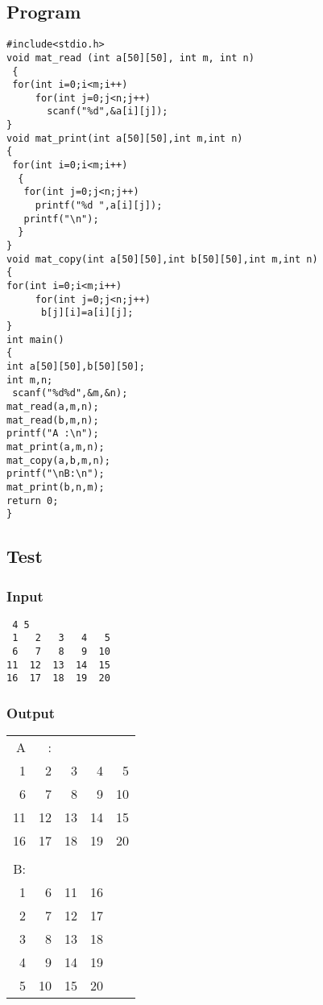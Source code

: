 \documentclass[11pt]{article}
\begin{document}
\subsection*{Program}
\label{sec-7-3}
\begin{verbatim}
#include<stdio.h>
void mat_read (int a[50][50], int m, int n)
 {
 for(int i=0;i<m;i++)
     for(int j=0;j<n;j++)
       scanf("%d",&a[i][j]);
}
void mat_print(int a[50][50],int m,int n)
{
 for(int i=0;i<m;i++)
  {
   for(int j=0;j<n;j++)
     printf("%d ",a[i][j]);
   printf("\n");
  }
}
void mat_copy(int a[50][50],int b[50][50],int m,int n)
{
for(int i=0;i<m;i++)
     for(int j=0;j<n;j++)
      b[j][i]=a[i][j];
}
int main()
{
int a[50][50],b[50][50];
int m,n;
 scanf("%d%d",&m,&n);
mat_read(a,m,n);
mat_read(b,m,n);
printf("A :\n");
mat_print(a,m,n);
mat_copy(a,b,m,n);
printf("\nB:\n");
mat_print(b,n,m);
return 0;
}
\end{verbatim}
\subsection*{Test}
\label{sec-7-4}
\subsubsection*{Input}
\label{sec-7-4-1}
\begin{verbatim}
 4 5
 1   2   3   4   5 
 6   7   8   9  10 
11  12  13  14  15 
16  17  18  19  20
\end{verbatim}

\subsubsection*{Output}
\label{sec-7-4-2}
\begin{center}
\begin{tabular}{rrrrr}
A & : &  &  & \\
1 & 2 & 3 & 4 & 5\\
6 & 7 & 8 & 9 & 10\\
11 & 12 & 13 & 14 & 15\\
16 & 17 & 18 & 19 & 20\\
 &  &  &  & \\
B: &  &  &  & \\
1 & 6 & 11 & 16 & \\
2 & 7 & 12 & 17 & \\
3 & 8 & 13 & 18 & \\
4 & 9 & 14 & 19 & \\
5 & 10 & 15 & 20 & \\
\end{tabular}
\end{center}
\end{document}
